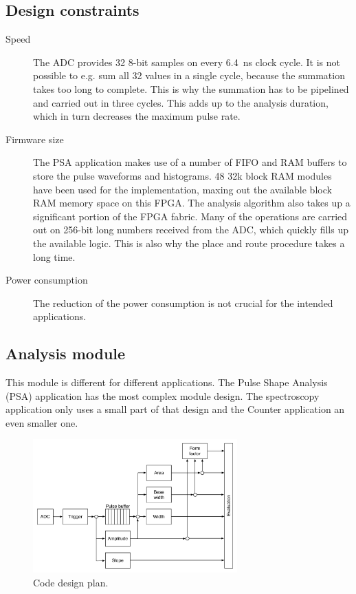 \subsection{Design constraints}
\begin{description}
\item[Speed] The ADC provides 32 8-bit samples on every 6.4~ns clock cycle. It is not possible to e.g. sum all 32 values in a single cycle, because the summation takes too long to complete. This is why the summation has to be pipelined and carried out in three cycles. This adds up to the analysis duration, which in turn decreases the maximum pulse rate.
\item[Firmware size] The PSA application makes use of a number of FIFO and RAM buffers to store the pulse waveforms and histograms. 48 32k block RAM modules have been used for the implementation, maxing out the available block RAM memory space on this FPGA. The analysis algorithm also takes up a significant portion of the FPGA fabric. Many of the operations are carried out on 256-bit long numbers received from the ADC, which quickly fills up the available logic. This is also why the place and route procedure takes a long time.
\item[Power consumption] The reduction of the power consumption is not crucial for the intended applications.
\end{description}


\subsection{Analysis module}
\label{subsec:algorithm}
This module is different for different applications. The Pulse Shape Analysis (PSA) application has the most complex module design. The spectroscopy application only uses a small part of that design and the Counter application an even smaller one.


\begin{figure}[!t]
\centering
\includegraphics[width=0.7\textwidth]{05_current_monitoring/plots/analysis1}
\caption{Code design plan.}
\label{fig:architecture}
\end{figure}

